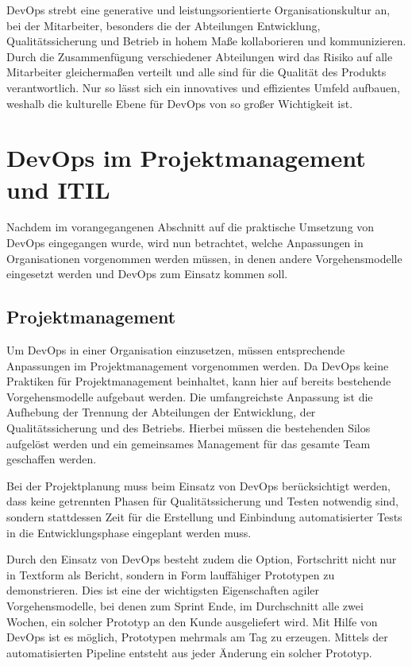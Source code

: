 DevOps strebt eine generative und leistungsorientierte Organisationskultur an, bei der Mitarbeiter, besonders die der Abteilungen Entwicklung, Qualitätssicherung und Betrieb in hohem Maße kollaborieren und kommunizieren. 
Durch die Zusammenfügung verschiedener Abteilungen wird das Risiko auf alle Mitarbeiter gleichermaßen verteilt und alle sind für die Qualität des Produkts verantwortlich.
Nur so lässt sich ein innovatives und effizientes Umfeld aufbauen, weshalb die kulturelle Ebene für DevOps von so großer Wichtigkeit ist.

\section{DevOps im Projektmanagement und ITIL} %
Nachdem im vorangegangenen Abschnitt auf die praktische Umsetzung von DevOps eingegangen wurde, wird nun betrachtet, welche Anpassungen in Organisationen vorgenommen werden müssen, in denen andere Vorgehensmodelle eingesetzt werden und DevOps zum Einsatz kommen soll.

\subsection{Projektmanagement}
Um DevOps in einer Organisation einzusetzen, müssen entsprechende Anpassungen im Projektmanagement vorgenommen werden. 
Da DevOps keine Praktiken für Projektmanagement beinhaltet, kann hier auf bereits bestehende Vorgehensmodelle aufgebaut werden.
 Die umfangreichste Anpassung ist die Aufhebung der Trennung der Abteilungen der Entwicklung, der Qualitätssicherung und des Betriebs. 
 Hierbei müssen die bestehenden Silos aufgelöst werden und ein gemeinsames Management für das gesamte Team geschaffen werden.
 
Bei der Projektplanung muss beim Einsatz von DevOps berücksichtigt werden, dass keine getrennten Phasen für Qualitätssicherung und Testen notwendig sind, sondern stattdessen Zeit für die Erstellung und Einbindung automatisierter Tests in die Entwicklungsphase eingeplant werden muss.

Durch den Einsatz von DevOps besteht zudem die Option, Fortschritt nicht nur in Textform als Bericht, sondern in Form lauffähiger Prototypen zu demonstrieren. 
Dies ist eine der wichtigsten Eigenschaften agiler Vorgehensmodelle, bei denen zum Sprint Ende, im Durchschnitt alle zwei Wochen, ein solcher Prototyp an den Kunde ausgeliefert wird. 
Mit Hilfe von DevOps ist es möglich, Prototypen mehrmals am Tag zu erzeugen. Mittels der automatisierten Pipeline entsteht aus jeder Änderung ein solcher Prototyp.

